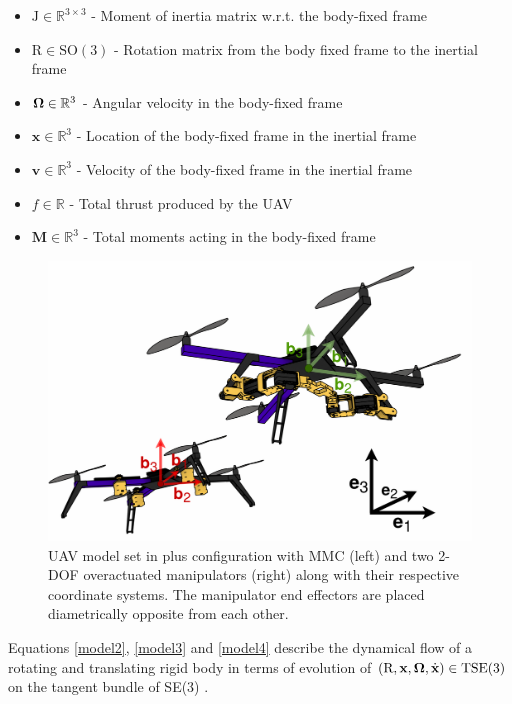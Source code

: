 \begin{itemize}
	\item $\text{J} \in \mathbb{R}^{3 \times 3}$ - Moment of inertia matrix w.r.t. the body-fixed frame
	
	\item $\text{R} \in \text{SO}(3)$ - Rotation matrix from the body fixed frame to the inertial frame
	
	\item $\boldsymbol{\Omega} \in \mathbb{R}^3$ - Angular velocity in the body-fixed frame
	
	\item $\textbf{x} \in \mathbb{R}^3$ - Location of the body-fixed frame in the inertial frame
	
	\item $\textbf{v} \in \mathbb{R}^3$ - Velocity of the body-fixed frame in the inertial frame
	
	\item $f \in \mathbb{R}$ - Total thrust produced by the UAV
	
	\item $\textbf{M} \in \mathbb{R}^3$ - Total moments acting in the body-fixed frame
\end{itemize}
\begin{figure}
	\includegraphics[width=\columnwidth]{pictures/uav.png}	
	\centering
	\caption{UAV model set in plus configuration with MMC (left) and two 2-DOF overactuated manipulators (right) along with their respective coordinate systems. The manipulator end effectors are placed diametrically opposite from each other.}
	\label{fig:uav_model}
\end{figure}
\noindent Equations \eqref{model2}, \eqref{model3} and \eqref{model4} describe the dynamical flow of a rotating and translating rigid body in terms of evolution of $(\text{R},\textbf{x},\boldsymbol{\Omega},\dot{\textbf{x}})\in \text{TSE}(3)$ on the tangent bundle of SE(3) \cite{LeeModel}. 

